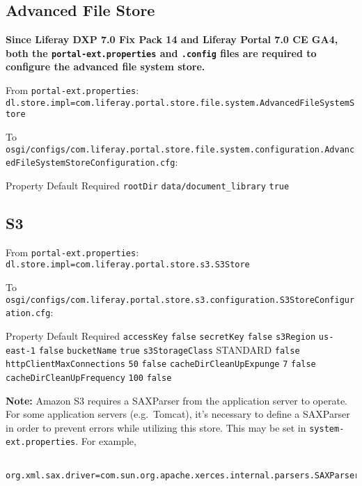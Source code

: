\subsection{Advanced File Store}\label{advanced-file-store}

\textbf{Since Liferay DXP 7.0 Fix Pack 14 and Liferay Portal 7.0 CE GA4,
both the \texttt{portal-ext.properties} and \texttt{.config} files are
required to configure the advanced file system store.}

From \texttt{portal-ext.properties}:
\texttt{dl.store.impl=com.liferay.portal.store.file.system.AdvancedFileSystemStore}

To
\texttt{osgi/configs/com.liferay.portal.store.file.system.configuration.AdvancedFileSystemStoreConfiguration.cfg}:

Property \textbar{} Default \textbar{} Required \texttt{rootDir}
\textbar{} \texttt{data/document\_library} \textbar{} \texttt{true}

\subsection{S3}\label{s3}

From \texttt{portal-ext.properties}:
\texttt{dl.store.impl=com.liferay.portal.store.s3.S3Store}

To
\texttt{osgi/configs/com.liferay.portal.store.s3.configuration.S3StoreConfiguration.cfg}:

Property \textbar{} Default \textbar{} Required \texttt{accessKey}
\textbar{} \textbar{} \texttt{false} \texttt{secretKey} \textbar{}
\textbar{} \texttt{false} \texttt{s3Region} \textbar{}
\texttt{us-east-1} \textbar{} \texttt{false} \texttt{bucketName}
\textbar{} \textbar{} \texttt{true} \texttt{s3StorageClass} \textbar{}
STANDARD \textbar{} \texttt{false} \texttt{httpClientMaxConnections}
\textbar{} \texttt{50} \textbar{} \texttt{false}
\texttt{cacheDirCleanUpExpunge} \textbar{} \texttt{7} \textbar{}
\texttt{false} \texttt{cacheDirCleanUpFrequency} \textbar{} \texttt{100}
\textbar{} \texttt{false}

\noindent\hrulefill

\textbf{Note:} Amazon S3 requires a SAXParser from the application
server to operate. For some application servers (e.g.~Tomcat), it's
necessary to define a SAXParser in order to prevent errors while
utilizing this store. This may be set in \texttt{system-ext.properties}.
For example,

\begin{verbatim}
 org.xml.sax.driver=com.sun.org.apache.xerces.internal.parsers.SAXParser
\end{verbatim}

